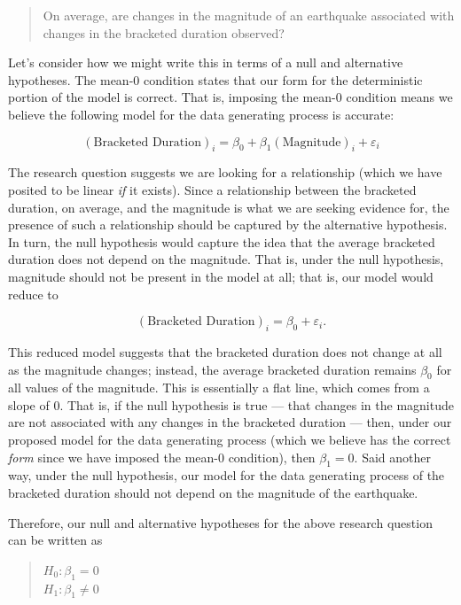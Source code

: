 \documentclass[
  letterpaper,
  DIV=11,
  numbers=noendperiod]{scrreprt}
\theoremstyle{definition}
\theoremstyle{definition}
\theoremstyle{plain}
\theoremstyle{remark}
\begin{document}
\begin{quote}
On average, are changes in the magnitude of an earthquake associated
with changes in the bracketed duration observed?
\end{quote}

Let's consider how we might write this in terms of a null and
alternative hypotheses. The mean-0 condition states that our form for
the deterministic portion of the model is correct. That is, imposing the
mean-0 condition means we believe the following model for the data
generating process is accurate:

\[(\text{Bracketed Duration})_i = \beta_0 + \beta_1(\text{Magnitude})_i + \varepsilon_i\]

The research question suggests we are looking for a relationship (which
we have posited to be linear \emph{if} it exists). Since a relationship
between the bracketed duration, on average, and the magnitude is what we
are seeking evidence for, the presence of such a relationship should be
captured by the alternative hypothesis. In turn, the null hypothesis
would capture the idea that the average bracketed duration does not
depend on the magnitude. That is, under the null hypothesis, magnitude
should not be present in the model at all; that is, our model would
reduce to

\[(\text{Bracketed Duration})_i = \beta_0 + \varepsilon_i.\]

This reduced model suggests that the bracketed duration does not change
at all as the magnitude changes; instead, the average bracketed duration
remains \(\beta_0\) for all values of the magnitude. This is essentially
a flat line, which comes from a slope of 0. That is, if the null
hypothesis is true --- that changes in the magnitude are not associated
with any changes in the bracketed duration --- then, under our proposed
model for the data generating process (which we believe has the correct
\emph{form} since we have imposed the mean-0 condition), then
\(\beta_1 = 0\). Said another way, under the null hypothesis, our model
for the data generating process of the bracketed duration should not
depend on the magnitude of the earthquake.

Therefore, our null and alternative hypotheses for the above research
question can be written as

\begin{quote}
\(H_0: \beta_1 = 0\)\\
\(H_1: \beta_1 \neq 0\)
\end{quote}
\end{document}
